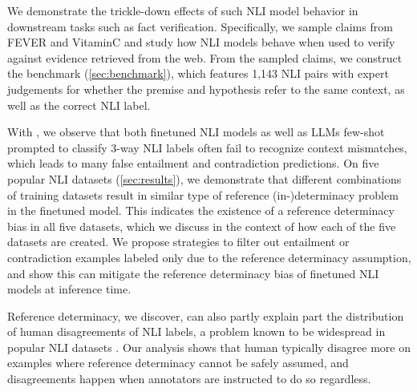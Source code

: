 We demonstrate the trickle-down effects of such NLI model behavior in downstream tasks such as fact verification.
Specifically, we sample claims from FEVER \cite{thorne-etal-2018-fever} and VitaminC \cite{schuster-etal-2021-get} and study how NLI models behave when used to verify against evidence retrieved from the web. From the sampled claims, we construct the \datasetname benchmark (\cref{sec:benchmark}), which features 1,143 NLI pairs with expert judgements for whether the premise and hypothesis refer to the same context, as well as the correct NLI label.

With \datasetname, we observe that both finetuned NLI models as well as LLMs few-shot prompted to classify 3-way NLI labels often fail to recognize context mismatches, which leads to many false entailment and contradiction predictions. On five popular NLI datasets (\cref{sec:results}), we demonstrate that different combinations of training datasets result in similar type of reference (in-)determinacy problem in the finetuned model. This indicates the existence of a reference determinacy bias in all five datasets, which we discuss in the context of how each of the five datasets are created. We propose strategies to filter out entailment or contradiction examples labeled only due to the reference determinacy assumption, and show this can mitigate the reference determinacy bias of finetuned NLI models at inference time.

Reference determinacy, we discover, can also partly explain part the distribution of human disagreements of NLI labels, a problem known to be widespread in popular NLI datasets  \cite{pavlick-kwiatkowski-2019-inherent,nie-etal-2020-learn}. Our analysis shows that human typically disagree more on examples where reference determinacy cannot be safely assumed, and disagreements happen when annotators are instructed to do so regardless.

